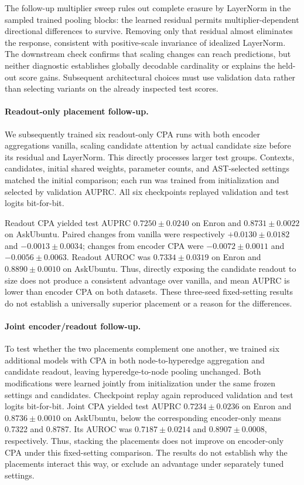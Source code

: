 \documentclass{article}
\begin{document}
The follow-up multiplier sweep rules out complete erasure by LayerNorm in the sampled trained pooling blocks: the learned residual permits multiplier-dependent directional differences to survive. Removing only that residual almost eliminates the response, consistent with positive-scale invariance of idealized LayerNorm. The downstream check confirms that scaling changes can reach predictions, but neither diagnostic establishes globally decodable cardinality or explains the held-out score gains. Subsequent architectural choices must use validation data rather than selecting variants on the already inspected test scores.

\paragraph{Readout-only placement follow-up.}
We subsequently trained six readout-only CPA runs with both encoder aggregations vanilla, scaling candidate attention by actual candidate size before its residual and LayerNorm. This directly processes larger test groups. Contexts, candidates, initial shared weights, parameter counts, and AST-selected settings matched the initial comparison; each run was trained from initialization and selected by validation AUPRC. All six checkpoints replayed validation and test logits bit-for-bit.

Readout CPA yielded test AUPRC $0.7250\pm0.0240$ on Enron and $0.8731\pm0.0022$ on AskUbuntu. Paired changes from vanilla were respectively $+0.0130\pm0.0182$ and $-0.0013\pm0.0034$; changes from encoder CPA were $-0.0072\pm0.0011$ and $-0.0056\pm0.0063$. Readout AUROC was $0.7334\pm0.0319$ on Enron and $0.8890\pm0.0010$ on AskUbuntu. Thus, directly exposing the candidate readout to size does not produce a consistent advantage over vanilla, and mean AUPRC is lower than encoder CPA on both datasets. These three-seed fixed-setting results do not establish a universally superior placement or a reason for the differences.

\paragraph{Joint encoder/readout follow-up.}
To test whether the two placements complement one another, we trained six additional models with CPA in both node-to-hyperedge aggregation and candidate readout, leaving hyperedge-to-node pooling unchanged. Both modifications were learned jointly from initialization under the same frozen settings and candidates. Checkpoint replay again reproduced validation and test logits bit-for-bit. Joint CPA yielded test AUPRC $0.7234\pm0.0236$ on Enron and $0.8736\pm0.0010$ on AskUbuntu, below the corresponding encoder-only means 0.7322 and 0.8787. Its AUROC was $0.7187\pm0.0214$ and $0.8907\pm0.0008$, respectively. Thus, stacking the placements does not improve on encoder-only CPA under this fixed-setting comparison. The results do not establish why the placements interact this way, or exclude an advantage under separately tuned settings.
\end{document}
